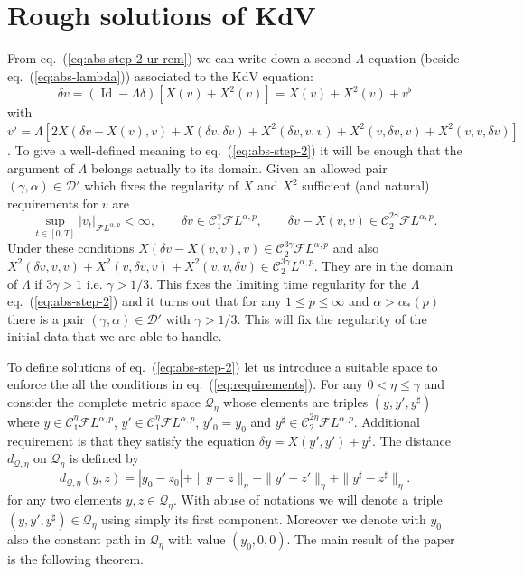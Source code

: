 \documentclass[a4paper,11pt,reqno]{article}
\newcommand{\der}{\delta}
\newcommand{\CC}{\mathcal{C}}
\newcommand{\DD}{\mathcal{D}}
\newcommand{\FF}{\mathcal{F}}
\newcommand{\QQ}{\mathcal{Q}}
\DeclareMathOperator{\id}{\text{Id}}
\begin{document}
\section{Rough solutions of KdV}
\label{sec:rough}
From eq.~(\ref{eq:abs-step-2-ur-rem}) we can write down
 a second $\Lambda$-equation (beside eq.~(\ref{eq:abs-lambda})) associated to the KdV equation:
\begin{equation}
  \label{eq:abs-step-2}
\der v = (\id - \Lambda \der)[X(v)+ X^2(v)] = X(v) +  X^2(v) + v^\flat  
\end{equation}
with
$
v^\flat = \Lambda[ 2 X(\der v- X(v),v) 
+ X(\der v,\der v) 
 +  X^2(\der v,v,v) +
 X^2(v,\der v,v) +  X^2( v,v,\der v)   ]
$.
To give a well-defined meaning to eq.~(\ref{eq:abs-step-2}) it will be enough that the argument of $\Lambda$ belongs actually to its domain. Given an allowed pair $(\gamma,\alpha) \in \DD'$ which fixes the regularity of $X$ and $ X^2$ sufficient (and natural) requirements for $v$ are
\begin{equation}
  \label{eq:requirements}
\sup_{t\in[0,T]}|v_t|_{\FF L^{\alpha,p}} <\infty,\qquad  \der v \in \CC^\gamma_1 \FF L^{\alpha,p},\qquad \der v - X(v,v) \in \CC^{2\gamma}_2 \FF L^{\alpha,p}.   
\end{equation}
Under these conditions $X(\der v- X(v,v),v) \in \CC^{3\gamma}_2  \FF L^{\alpha,p}$ and also $ X^2(\der v,v,v) +
 X^2(v,\der v,v) +  X^2( v,v,\der v) \in \CC^{3\gamma}_2 L^{\alpha,p}$. They are in the domain of $\Lambda$ if $3\gamma > 1$ i.e. $\gamma > 1/3$. This fixes the limiting time regularity for the $\Lambda$ eq.~(\ref{eq:abs-step-2}) and it turns out that for any $1\le p \le \infty$ and $\alpha > \alpha_*(p)$ there is a pair $(\gamma,\alpha) \in \DD'$ with $\gamma > 1/3$. This will fix the regularity of the initial data that we are able to handle.
 
To define solutions of eq.~(\ref{eq:abs-step-2}) let us introduce a suitable  space to enforce the all the conditions in eq.~(\ref{eq:requirements}).
For any $0 < \eta \le \gamma$ and consider the complete metric space $\QQ_\eta$ whose elements are triples $(y,y',y^\sharp)$
where $y \in \CC_1^\eta  \FF L^{\alpha,p}$, $y' \in \CC_1^\eta  \FF L^{\alpha,p}$, $y'_0 = y_0$ and $y^\sharp \in \CC_2^{2\eta}
 \FF L^{\alpha,p}$. Additional requirement is that they satisfy the equation $\der y = X(y',y') +
y^\sharp$.  The distance $d_{\QQ,\eta}$ on $\QQ_\eta$ is defined by
$$
d_{\QQ,\eta}(y,z) = |y_0-z_0| + \|y-z\|_{\eta} + \|y'-z'\|_{\eta} + \|y^\sharp-z^{\sharp}\|_{\eta}. 
$$
for any two elements $y,z \in \QQ_\eta$. 
With abuse of notations we will denote a triple
$(y,y',y^\sharp) \in \QQ_\eta$ using simply its first component.
Moreover  we denote with $y_0$ also the constant path in $\QQ_\eta$ with value $(y_0,0,0)$. 
The main result of the paper is the following theorem.
\end{document}
